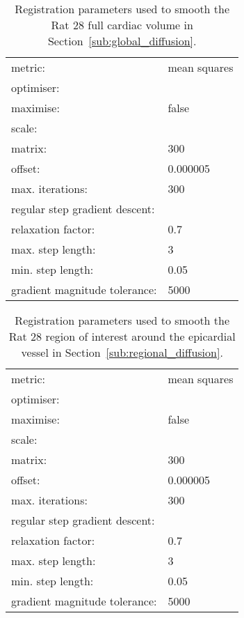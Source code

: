   \begin{table}[h]
    \centering
    \begin{tabular}{|ll|}
      \hline
      metric: & mean squares \\
      \multicolumn{2}{|l|}{optimiser:} \\
      \quad maximise: & false\\
      \multicolumn{2}{|l|}{\quad scale:} \\
      \quad\quad matrix: & 300 \\
      \quad\quad offset: & 0.000005 \\
      \quad max. iterations: & 300 \\
      \multicolumn{2}{|l|}{\quad regular step gradient descent:} \\
      \quad\quad relaxation factor: & 0.7 \\
      \quad\quad max. step length: & 3 \\
      \quad\quad min. step length: & 0.05 \\
      \quad\quad gradient magnitude tolerance: & 5000 \\
      \hline
    \end{tabular}
    
    \caption{Registration parameters used to smooth the Rat 28 full cardiac volume in Section~\ref{sub:global_diffusion}.}
    \label{tab:global_histo_to_histo}
  \end{table}
  
  \begin{table}[h]
    \centering
    \begin{tabular}{|ll|}
      \hline
      metric: & mean squares \\
      \multicolumn{2}{|l|}{optimiser:} \\
      \quad maximise: & false\\
      \multicolumn{2}{|l|}{\quad scale:} \\
      \quad\quad matrix: & 300 \\
      \quad\quad offset: & 0.000005 \\
      \quad max. iterations: & 300 \\
      \multicolumn{2}{|l|}{\quad regular step gradient descent:} \\
      \quad\quad relaxation factor: & 0.7 \\
      \quad\quad max. step length: & 3 \\
      \quad\quad min. step length: & 0.05 \\
      \quad\quad gradient magnitude tolerance: & 5000 \\
      \hline
    \end{tabular}
    
    \caption{Registration parameters used to smooth the Rat 28 region of interest around the epicardial vessel in Section~\ref{sub:regional_diffusion}.}
    \label{tab:regional_histo_to_histo}
  \end{table}
